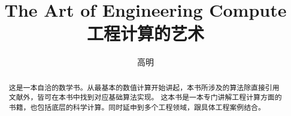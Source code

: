 \documentclass{ctexart}
\title{The Art of Engineering Compute \newline 工程计算的艺术}
\author{高明}
\begin{document}
\maketitle

\newpage

\begin{abstract}
这是一本自洽的数学书。从最基本的数值计算开始讲起，本书所涉及的算法除直接引用文献外，皆可在本书中找到对应基础算法实现。\newline
这本书是一本专门讲解工程计算方面的书籍，也包括底层的科学计算。同时延申到多个工程领域，跟具体工程案例结合。
\end{abstract}
\end{document}
